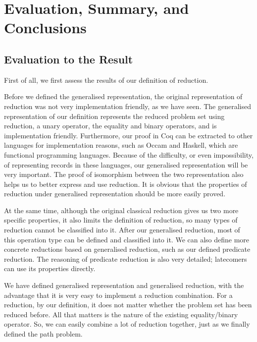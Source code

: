 \documentclass[a4paper,12pt,twoside,openright]{report}
\begin{document}
\chapter{Evaluation, Summary, and Conclusions} 


%

\section{Evaluation to the Result}
First of all, we first assess the results of our definition of reduction. 

Before we defined the generalised representation, the original representation of reduction was not very implementation friendly, as we have seen. The generalised representation of our definition represents the reduced problem set using reduction, a unary operator, the equality and binary operators, and is implementation friendly. Furthermore, our proof in Coq can be extracted to other languages for implementation reasons, such as Occam and Haskell, which are functional programming languages.  Because of the difficulty, or even impossibility, of representing records in these languages, our generalised representation will be very important. The proof of isomorphism between the two representation also helps us to better express and use reduction. It is obvious that the properties of reduction under generalised representation should be more easily proved.

At the same time, although the original classical reduction gives us two more specific properties, it also limits the definition of reduction, so many types of reduction cannot be classified into it. After our generalised reduction, most of this operation type can be defined and classified into it. We can also define more concrete reductions based on generalised reduction, such as our defined predicate reduction. The reasoning of predicate reduction is also very detailed; latecomers can use its properties directly.

We have defined generalised representation and generalised reduction, with the advantage that it is very easy to implement a reduction combination. For a reduction, by our definition, it does not matter whether the problem set has been reduced before. All that matters is the nature of the existing equality/binary operator. So, we can easily combine a lot of reduction together, just as we finally defined the path problem.
\end{document}

